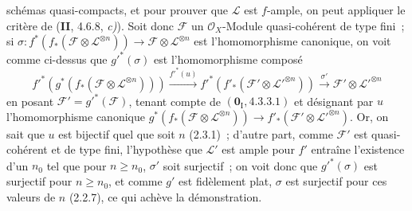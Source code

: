 schémas quasi-compacts, et pour prouver que $\mathcal L$ est $f$-ample, on
peut appliquer le critère de (\textbf{II}, 4.6.8, \emph{c)}). Soit donc $\mathcal F$ un
$\mathcal O_X$-Module quasi-cohérent de type fini~; si
$\sigma:f^*(f_*(\mathcal F\otimes\mathcal L^{\otimes n}))
\to\mathcal F\otimes\mathcal L^{\otimes n}$
est l'homomorphisme canonique, on voit comme ci-dessus que $g'^*(\sigma)$ est
l'homomorphisme composé
\[
f'^*(g^*(f_*(\mathcal F\otimes\mathcal L^{\otimes n})))
\xrightarrow{f'^*(u)}f'^*(f'_*(\mathcal F'\otimes
\mathcal L'^{\otimes n}))\xrightarrow{\sigma'}
\mathcal F'\otimes\mathcal L'^{\otimes n}
\]
en posant $\mathcal F'=g'^*(\mathcal F)$, tenant compte de
$(\mathbf{0}_{\mathrm I},4.3.3.1)$ et désignant par $u$ l'homomorphisme canonique
$g^*(f_*(\mathcal F\otimes\mathcal L^{\otimes n}))
\to f'_*(\mathcal F'\otimes\mathcal L'^{\otimes n})$.
Or, on sait que $u$ est bijectif quel que soit $n$ (2.3.1)~; d'autre part,
comme $\mathcal F'$ est quasi-cohérent et de type fini, l'hypothèse que
$\mathcal L'$ est ample pour $f'$ entraîne l'existence d'un $n_0$ tel que
pour $n\geq n_0$, $\sigma'$ soit surjectif~; on voit donc que
$g'^*(\sigma)$ est surjectif pour $n\geq n_0$, et comme $g'$ est fidèlement
plat, $\sigma$ est surjectif pour ces valeurs de $n$ (2.2.7), ce qui achève
la démonstration.

